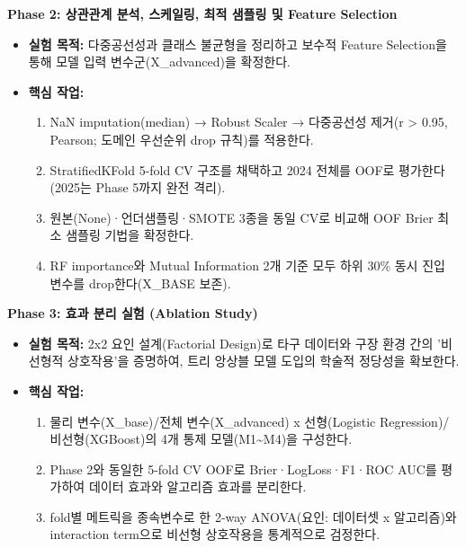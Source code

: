 \documentclass[
  11.5pt,
]{article}
\providecommand{\tightlist}{%
  \setlength{\itemsep}{0pt}\setlength{\parskip}{0pt}}
\begin{document}
\textbf{Phase 2: 상관관계 분석, 스케일링, 최적 샘플링 및 Feature
Selection}

\begin{itemize}
\tightlist
\item
  \textbf{실험 목적:} 다중공선성과 클래스 불균형을 정리하고 보수적
  Feature Selection을 통해 모델 입력 변수군(X\_advanced)을 확정한다.
\item
  \textbf{핵심 작업:}

  \begin{enumerate}
  \def\labelenumi{\arabic{enumi}.}
  \tightlist
  \item
    NaN imputation(median) → Robust Scaler → 다중공선성
    제거(\textbar r\textbar{} \textgreater{} 0.95, Pearson; 도메인
    우선순위 drop 규칙)를 적용한다.
  \item
    StratifiedKFold 5-fold CV 구조를 채택하고 2024 전체를 OOF로
    평가한다(2025는 Phase 5까지 완전 격리).
  \item
    원본(None)·언더샘플링·SMOTE 3종을 동일 CV로 비교해 OOF Brier 최소
    샘플링 기법을 확정한다.
  \item
    RF importance와 Mutual Information 2개 기준 모두 하위 30\% 동시 진입
    변수를 drop한다(X\_BASE 보존).
  \end{enumerate}
\end{itemize}

\textbf{Phase 3: 효과 분리 실험 (Ablation Study)}

\begin{itemize}
\tightlist
\item
  \textbf{실험 목적:} 2x2 요인 설계(Factorial Design)로 타구 데이터와
  구장 환경 간의 '비선형적 상호작용'을 증명하여, 트리 앙상블 모델 도입의
  학술적 정당성을 확보한다.
\item
  \textbf{핵심 작업:}

  \begin{enumerate}
  \def\labelenumi{\arabic{enumi}.}
  \tightlist
  \item
    물리 변수(X\_base)/전체 변수(X\_advanced) x 선형(Logistic
    Regression)/비선형(XGBoost)의 4개 통제 모델(M1\textasciitilde M4)을
    구성한다.
  \item
    Phase 2와 동일한 5-fold CV OOF로 Brier·LogLoss·F1·ROC AUC를 평가하여
    데이터 효과와 알고리즘 효과를 분리한다.
  \item
    fold별 메트릭을 종속변수로 한 2-way ANOVA(요인: 데이터셋 x
    알고리즘)와 interaction term으로 비선형 상호작용을 통계적으로
    검정한다.
  \end{enumerate}
\end{itemize}
\end{document}
